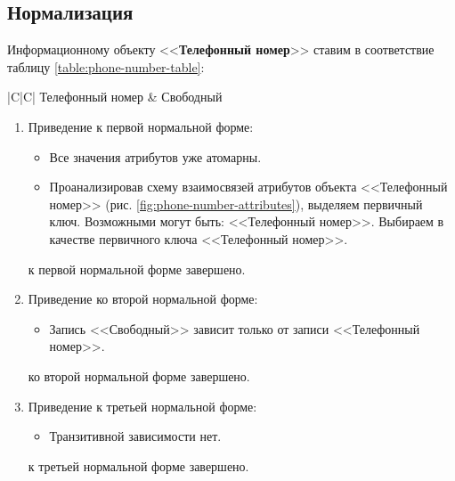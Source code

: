 \subsection{Нормализация}\label{normalization}



Информационному объекту <<\textbf{Телефонный номер}>> ставим в соответствие таблицу \ref{table:phone-number-table}:
\begin{table}[H]
    \caption{Таблица объекта <<Телефонный номер>>}
    \label{table:phone-number-table}
    \renewcommand{\arraystretch}{1.5}
    \renewcommand{\tabularxcolumn}[1]{m{#1}}
    \begin{tabularx}{\textwidth}{|C|C|}
        \hline
        Телефонный номер & Свободный \\ \hline
    \end{tabularx}
\end{table}

\begin{enumerate}
    \item Приведение к первой нормальной форме:
    \begin{itemize}
        \item Все значения атрибутов уже атомарны.
        \item Проанализировав схему взаимосвязей атрибутов объекта <<Телефонный номер>> (рис. \ref{fig:phone-number-attributes}), выделяем первичный ключ. Возможными могут быть: <<Телефонный номер>>. Выбираем в качестве первичного ключа <<Телефонный номер>>.
    \end{itemize}
    \tab{} к первой нормальной форме завершено.

    \item Приведение ко второй нормальной форме:
    \begin{itemize}
        \item Запись <<Свободный>> зависит только от записи <<Телефонный номер>>.
    \end{itemize}
    \tab{} ко второй нормальной форме завершено.

    \item Приведение к третьей нормальной форме:
    \begin{itemize}
        \item Транзитивной зависимости нет.
    \end{itemize}
    \tab{} к третьей нормальной форме завершено.
\end{enumerate}

